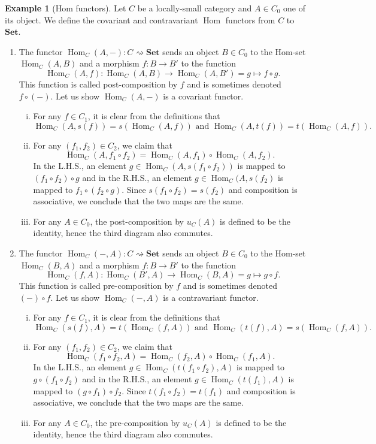\documentclass{article}
\theoremstyle{definition}
\newtheorem{exmp}[thm]{Example}
\theoremstyle{remark}
\DeclareMathOperator{\Hom}{Hom}
\begin{document}
\begin{exmp}[Hom functors]
	Let $C$ be a locally-small category and $A \in C_0$ one of its object. We define the covariant and contravariant $\Hom$ functors from $C$ to $\textbf{Set}$.
	\begin{enumerate}
		\item The functor $\Hom_C(A,-): C \rightsquigarrow \textbf{Set}$ sends an object $B\in C_0$ to the Hom-set $\Hom_C(A,B)$ and a morphism $f:B\rightarrow B'$ to the function $$\Hom_C(A,f): \Hom_C(A,B) \rightarrow \Hom_C(A,B') = g \mapsto f\circ g.$$
		This function is called post-composition by $f$ and is sometimes denoted $f \circ (-)$. Let us show $\Hom_C(A, -)$ is a covariant functor.
		\begin{enumerate}[i.]
			\item For any $f \in C_1$, it is clear from the definitions that \[\Hom_C(A,s(f)) = s(\Hom_C(A,f)) \text{ and } \Hom_C(A,t(f)) = t(\Hom_C(A,f)).\]
			\item For any $(f_1,f_2) \in C_2$, we claim that \[\Hom_C(A,f_1\circ f_2) = \Hom_C(A,f_1)\circ \Hom_C(A,f_2).\] In the L.H.S., an element $g \in \Hom_C(A,s(f_1\circ f_2))$ is mapped to $(f_1 \circ f_2) \circ g$ and in the R.H.S., an element $g \in \Hom_C(A,s(f_2)$ is mapped to $f_1\circ (f_2 \circ g)$. Since $s(f_1 \circ f_2) = s(f_2)$ and composition is associative, we conclude that the two maps are the same.
			\item For any $A \in C_0$, the post-composition by $u_C(A)$ is defined to be the identity, hence the third diagram also commutes.
		\end{enumerate}
		\item The functor $\Hom_C(-,A): C \rightsquigarrow \textbf{Set}$ sends an object $B\in C_0$ to the Hom-set $\Hom_C(B,A)$ and a morphism $f:B\rightarrow B'$ to the function $$\Hom_C(f,A): \Hom_C(B',A) \rightarrow \Hom_C(B,A) = g \mapsto g\circ f.$$
		This function is called pre-composition by $f$ and is sometimes denoted $(-) \circ f$. Let us show $\Hom_C(-,A)$ is a contravariant functor.
		\begin{enumerate}[i.]
			\item For any $f \in C_1$, it is clear from the definitions that \[\Hom_C(s(f),A) = t(\Hom_C(f,A))\text{ and } \Hom_C(t(f),A) = s(\Hom_C(f,A)).\]
			\item For any $(f_1,f_2) \in C_2$, we claim that \[\Hom_C(f_1\circ f_2,A) = \Hom_C(f_2,A)\circ \Hom_C(f_1,A).\] In the L.H.S., an element $g \in \Hom_C(t(f_1\circ f_2),A)$ is mapped to $g\circ (f_1 \circ f_2)$ and in the R.H.S., an element $g \in \Hom_C(t(f_1),A)$ is mapped to $(g\circ f_1) \circ f_2$. Since $t(f_1 \circ f_2) = t(f_1)$ and composition is associative, we conclude that the two maps are the same.
			\item For any $A \in C_0$, the pre-composition by $u_C(A)$ is defined to be the identity, hence the third diagram also commutes.
		\end{enumerate}
	\end{enumerate}
\end{exmp}
\end{document}
